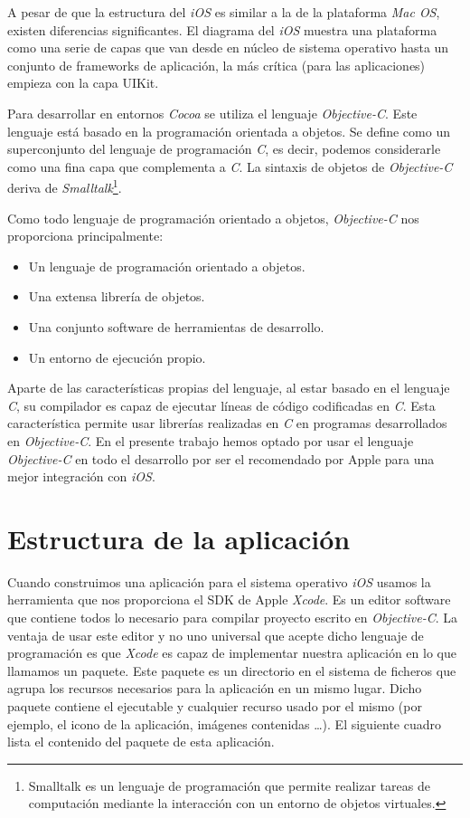  A pesar de que la estructura del \emph{iOS} es similar a la de la plataforma \emph{Mac OS}, existen diferencias significantes. El diagrama del \emph{iOS} muestra una plataforma como una serie de capas que van desde en núcleo de sistema operativo hasta un conjunto de frameworks de aplicación, la más crítica (para las aplicaciones) empieza con la capa UIKit.
 
 Para desarrollar en entornos \emph{Cocoa} se utiliza el lenguaje \emph{Objective-C}. Este lenguaje está basado en la programación orientada a objetos. Se define como un superconjunto del lenguaje de programación \emph{C}, es decir, podemos considerarle como una fina capa que complementa a \emph{C}. La sintaxis de objetos de \emph{Objective-C} deriva de \emph{Smalltalk}\footnote{Smalltalk es un lenguaje de programación que permite realizar tareas de computación mediante la interacción con un entorno de objetos virtuales.}.
 
  Como todo lenguaje de programación orientado a objetos, \emph{Objective-C} nos proporciona principalmente:
 \begin{itemize}
	\item Un lenguaje de programación orientado a objetos.
	\item Una extensa librería de objetos.
	\item Una conjunto software de herramientas de desarrollo.
	\item Un entorno de ejecución propio.
\end{itemize}

 Aparte de las características propias del lenguaje, al estar basado en el lenguaje \emph{C}, su compilador es capaz de ejecutar líneas de código codificadas en \emph{C}. Esta característica permite usar librerías realizadas en \emph{C} en programas desarrollados en \emph{Objective-C}.  En el presente trabajo hemos optado por usar el lenguaje \emph{Objective-C} en todo el desarrollo por ser el recomendado por Apple para una mejor integración con \emph{iOS}.
 
\section{Estructura de la aplicación}
 Cuando construimos una aplicación para el sistema operativo \emph{iOS} usamos la herramienta que nos proporciona el SDK de Apple \emph{Xcode}. Es un editor software que contiene todos lo necesario para compilar proyecto escrito en \emph{Objective-C}. La ventaja de usar este editor y no uno universal que acepte dicho lenguaje de programación es que \emph{Xcode} es capaz de implementar nuestra aplicación en lo que llamamos un paquete. Este paquete es un directorio en el sistema de ficheros que agrupa los recursos necesarios para la aplicación en un mismo lugar. Dicho paquete contiene el ejecutable y cualquier recurso usado por el mismo (por ejemplo, el icono de la aplicación, imágenes contenidas \ldots). El siguiente cuadro lista el contenido del paquete de esta aplicación.
 
